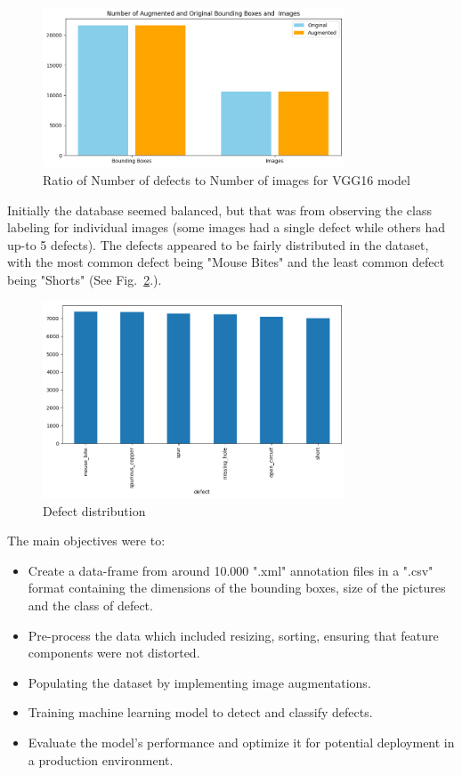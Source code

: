 \documentclass[12pt]{article}
\begin{document}
\begin{figure}[h]
    \centering
    \includegraphics[width=0.8\textwidth]{./graphics/2.png}
    \caption{Ratio of Number of defects to Number of images for VGG16 model}
    \label{fig:ratio_dataset_vgg16}
\end{figure}

Initially the database seemed balanced, but that was from observing the class labeling for individual images (some images had a single defect while others had up-to 5 defects). The defects appeared to be fairly distributed in the dataset, with the most common defect being "Mouse Bites" and the least common defect being "Shorts" (See Fig.~\ref{fig:defect_dist}.).

\begin{figure}[h]
    \centering
    \includegraphics[width=0.8\textwidth]{./graphics/1.png}
    \caption{Defect distribution}
    \label{fig:defect_dist}
\end{figure}

\clearpage

The main objectives were to:
\begin{itemize}
    \item Create a data-frame from around 10.000 ".xml" annotation files in a ".csv" format containing the dimensions of the bounding boxes, size of the pictures and the class of defect.
    \item Pre-process the data which included resizing, sorting, ensuring that feature components were not distorted. 
    \item Populating the dataset by implementing image augmentations.
    \item Training machine learning model to detect and classify defects.
    \item Evaluate the model's performance and optimize it for potential deployment in a production environment.
\end{itemize}
\end{document}

